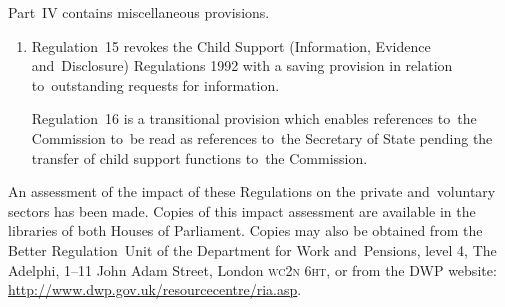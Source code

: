\documentclass[12pt,a4paper]{article}
\begin{document}
Part~IV contains miscellaneous provisions.
\begin{enumerate}\item[]
Regulation~15 revokes the Child Support (Information, Evidence and~Disclosure) Regulations 1992 with a saving provision in relation to~outstanding requests for information.

Regulation~16 is a transitional provision which enables references to~the Commission to~be read as references to~the Secretary of State pending the transfer of child support functions to~the Commission.
\end{enumerate}

An assessment of the impact of these Regulations on the private and~voluntary sectors has been made. Copies of this impact assessment are available in the libraries of both Houses of Parliament. Copies may also be obtained from the Better Regulation~Unit of the Department for Work and~Pensions, level 4, The Adelphi, 1--11 John Adam Street, London \textsc{\lowercase{WC2N 6HT}}, or from the DWP website: \url{http://www.dwp.gov.uk/resourcecentre/ria.asp}. 
\end{document}
